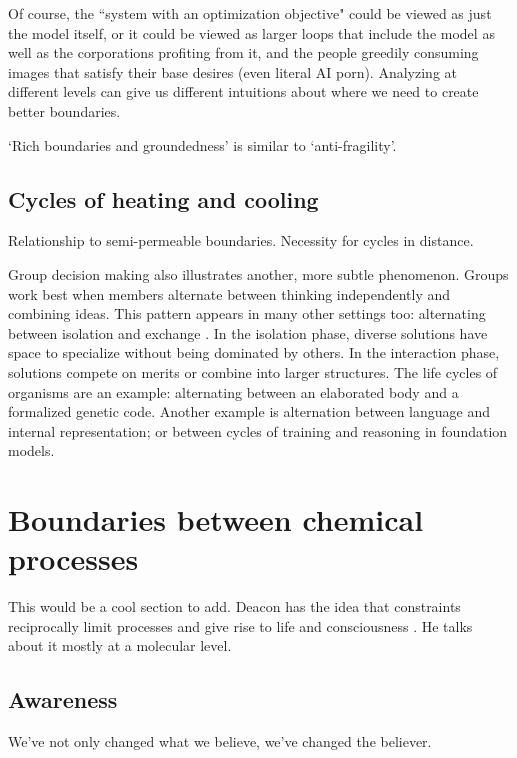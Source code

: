 Of course, the ``system with an optimization objective" could be viewed as just the model itself, or it could be viewed as larger loops that include the model as well as the corporations profiting from it, and the people greedily consuming images that satisfy their base desires (even literal AI porn). Analyzing at different levels can give us different intuitions about where we need to create better boundaries.

`Rich boundaries and groundedness' is similar to `anti-fragility'.



\subsection{Cycles of heating and cooling}

Relationship to semi-permeable boundaries. Necessity for cycles in distance.


Group decision making also illustrates another, more subtle phenomenon. Groups work best when members alternate between thinking independently and combining ideas. This pattern appears in many other settings too: alternating between isolation and exchange \citep{yanai2024takes, hills2015exploration, becker2018wet}. In the isolation phase, diverse solutions have space to specialize without being dominated by others. In the interaction phase, solutions compete on merits or combine into larger structures. The life cycles of organisms are an example: alternating between an elaborated body and a formalized genetic code. Another example is alternation between language and internal representation; or between cycles of training and reasoning in foundation models.

\section{Boundaries between chemical processes}

This would be a cool section to add. Deacon has the idea that constraints reciprocally limit processes and give rise to life and consciousness \citep{deacon2012incomplete}. He talks about it mostly at a molecular level.

\subsection{Awareness}


We've not only changed what we believe, we've changed the believer.

